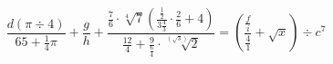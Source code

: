 \documentclass[10pt,a4paper,landscape]{article}
\author{Esek Nicolas}
\begin{document}
$$ \frac{d(\pi \div 4)}{65 + \frac{1}{4} \pi } + \frac{g}{h} + \frac{\frac{7}{6} \cdot \sqrt[4]{7} \left(  \frac{\frac{1}{2}}{3\frac{4}{3}} \cdot \frac{2}{6} + 4  \right) }{\frac{12}{4} + \frac{9}{\frac{6}{4}} \cdot \sqrt[(\sqrt{3})]{2} } = \left(  \frac{\frac{f}{i}}{\frac{4}{1}} + \sqrt{x} \right) \div c^{7} $$
\end{document}

